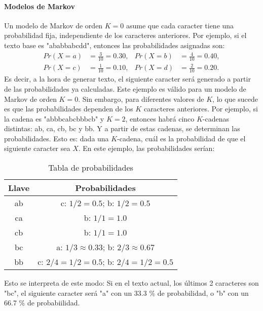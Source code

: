 \paragraph{Modelos de Markov}  Un modelo de Markov de orden $K=0$ asume que cada caracter tiene una probabilidad fija, independiente de los caracteres anteriores.
Por ejemplo, si el texto base es "ababbabcdd", entonces las probabilidades asignadas son:
\begin{align*}
Pr(X=a)&=\frac{3}{10}=0.30, & 
Pr(X=b)&=\frac{4}{10}=0.40,\\
Pr(X=c)&=\frac{1}{10}=0.10, &
Pr(X=d)&=\frac{2}{10}=0.20.
\end{align*}
Es decir, a la hora de generar texto, el siguiente caracter será generado a partir de las probabilidades ya calculadas.
Este ejemplo es válido para un modelo de Markov de orden $K=0$. Sin embargo, para diferentes valores de $K$, lo que sucede es que las probabilidades dependen de los $K$ caracteres anteriores. Por ejemplo, si la cadena es "abbbcabcbbbcb" y $K=2$, entonces habrá cinco $K$-cadenas distintas: ab, ca, cb, bc y bb. Y a partir de estas cadenas, se determinan las probabilidades. Esto es: dada una $K$-cadena, cuál es la probabilidad de que el siguiente caracter sea $X$.
En este ejemplo, las probabilidades serían:
\begin{table}[ht!]
    \centering
    \begin{tabular}{|c|c|}
    \hline
        Llave & Probabilidades \\
    \hline
        ab & c: $1/2=0.5$; b: $1/2=0.5$\\
    \hline
        ca & b: $1/1=1.0$\\
    \hline
        cb & b: $1/1=1.0$\\
    \hline
        bc & a: $1/3\approx0.33$; b: $2/3\approx0.67$\\
    \hline
        bb & c: $2/4=1/2=0.5$; b: $2/4=1/2=0.5$\\
    \hline
    \end{tabular}
    \caption{Tabla de probabilidades}
    \label{tab:my_label}
\end{table}

Esto se interpreta de este modo: Si en el texto actual, los últimos 2 caracteres son "bc", el siguiente caracter será "a" con un 33.3 \% de probabilidad, o "b" con un 66.7 \% de probabiilidad.

